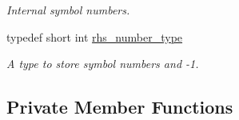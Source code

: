 \begin{DoxyCompactItemize}
\begin{DoxyCompactList}\small\item\em Internal symbol numbers. \end{DoxyCompactList}\item 
\hypertarget{classyy_1_1CParser_a75194fde4bb83b43553c5c277db54e0d}{typedef short int \hyperlink{classyy_1_1CParser_a75194fde4bb83b43553c5c277db54e0d}{rhs\-\_\-number\-\_\-type}}\label{classyy_1_1CParser_a75194fde4bb83b43553c5c277db54e0d}

\begin{DoxyCompactList}\small\item\em A type to store symbol numbers and -\/1. \end{DoxyCompactList}\end{DoxyCompactItemize}
\subsection*{Private Member Functions}
